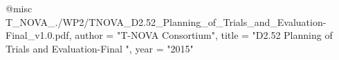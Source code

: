 @misc{ T_NOVA_./WP2/TNOVA_D2.52_Planning_of_Trials_and_Evaluation-Final_v1.0.pdf,
       author = "{T-NOVA Consortium}",
       title = "D2.52 Planning of Trials and Evaluation-Final ",
       year = "2015" }
